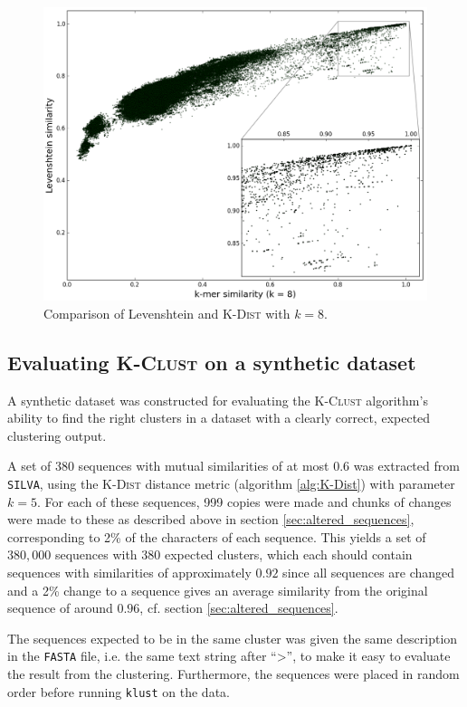 \begin{figure}[H]
  \includegraphics[width=1.0\textwidth]{graphics/Levenshtein_K-Dist_k8.png}
  \caption{Comparison of Levenshtein and \textsc{K-Dist} with $k=8$.}
  \label{fig:Levenshtein_vs_KDist}
\end{figure}


\subsection{Evaluating \textsc{K-Clust} on a synthetic dataset}
\label{sec:synth_dataset}

A synthetic dataset was constructed for evaluating the \textsc{K-Clust}
algorithm's ability to find the right clusters in a dataset with a clearly
correct, expected clustering output.

A set of 380 sequences with mutual similarities of at most 0.6 was extracted
from \texttt{SILVA}, using the \textsc{K-Dist} distance metric (algorithm
\ref{alg:K-Dist}) with parameter $k=5$. For each of these sequences, 999 copies
were made and chunks of changes were made to these as described above in
section \ref{sec:altered_sequences}, corresponding to 2\% of the characters of
each sequence. This yields a set of $380,000$ sequences with 380 expected
clusters, which each should contain sequences with similarities of
approximately $0.92$ since all sequences are changed and a 2\% change to a
sequence gives an average similarity from the original sequence of around
$0.96$, cf. section \ref{sec:altered_sequences}.

The sequences expected to be in the same cluster was given the same description
in the \texttt{FASTA} file, i.e. the same text string after ``>'', to make it
easy to evaluate the result from the clustering. Furthermore, the sequences
were placed in random order before running \texttt{klust} on the data.

